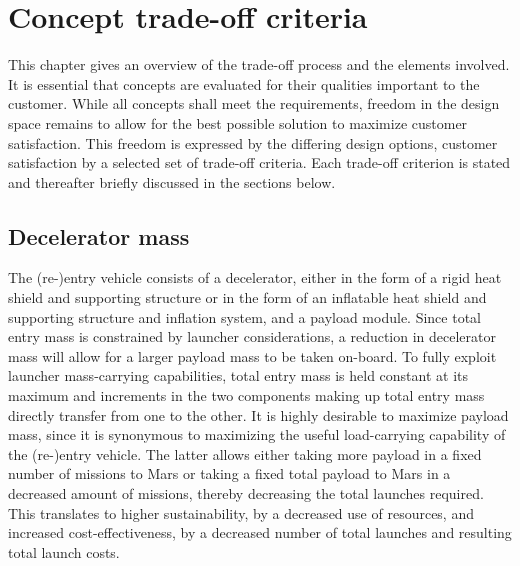 \section{Concept trade-off criteria}
\label{ch:tradeoff}
This chapter gives an overview of the trade-off process and the elements involved. It is essential that concepts are evaluated for their qualities important to the customer. While all concepts shall meet the requirements, freedom in the design space remains to allow for the best possible solution to maximize customer satisfaction. This freedom is expressed by the differing design options, customer satisfaction by a selected set of trade-off criteria. Each trade-off criterion is stated and thereafter briefly discussed in the sections below.

\subsection{Decelerator mass}\label{subsub:decelmass}
The (re-)entry vehicle consists of a decelerator, either in the form of a rigid heat shield and supporting structure or in the form of an inflatable heat shield and supporting structure and inflation system, and a payload module. Since total entry mass is constrained by launcher considerations, a reduction in decelerator mass will allow for a larger payload mass to be taken on-board. To fully exploit launcher mass-carrying capabilities, total entry mass is held constant at its maximum and increments in the two components making up total entry mass directly transfer from one to the other. It is highly desirable to maximize payload mass, since it is synonymous to maximizing the useful load-carrying capability of the (re-)entry vehicle. The latter allows either taking more payload in a fixed number of missions to Mars or taking a fixed total payload to Mars in a decreased amount of missions, thereby decreasing the total launches required. This translates to higher sustainability, by a decreased use of resources, and increased cost-effectiveness, by a decreased number of total launches and resulting total launch costs.


